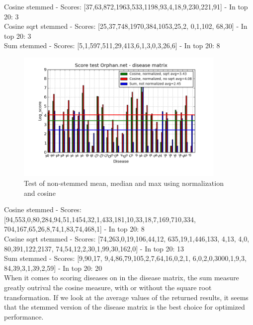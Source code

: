  
Cosine stemmed - Scores: [37,63,872,1963,533,1198,93,4,18,9,230,221,91] - In top 20: 3 \\
Cosine sqrt stemmed - Scores: [25,37,748,1970,384,1053,25,2, 0,1,102, 68,30] - In top 20: 3 \\
Sum stemmed - Scores: [5,1,597,511,29,413,6,1,3,0,3,26,6] - In top 20: 8 \\

\begin{figure}[h!]
        \begin{center}
          \includegraphics[width=0.9\textwidth]{barcharts/diseaseMatrix_orphan_hist_NOTnorm_3000_s_cos_sqrt_cos_sum_nn.png}
        \end{center}
        \caption{Test of non-stemmed mean, median and max using normalization and cosine}
        \label{diseaseMatrix_orphan_hist_NOTnorm_3000_s_cos_sqrt_cos_sum_nn}
\end{figure}

 
Cosine stemmed - Scores: [94,553,0,80,284,94,51,1454,32,1,433,181,10,33,18,7,169,710,334, 704,167,65,26,8,74,1,83,74,468,1] - In top 20: 8 \\
Cosine sqrt stemmed - Scores: [74,263,0,19,106,44,12, 635,19,1,446,133, 4,13, 4,0, 80,391,122,2137, 74,54,12,2,30,1,99,30,162,0] - In top 20: 13 \\
Sum stemmed - Scores: [9,90,17, 9,4,86,79,105,2,7,64,16,0,2,1, 6,0,2,0,3000,1,9,3, 84,39,3,1,39,2,59] - In top 20: 20 \\

When it comes to scoring diseases on in the disease matrix, the sum measure greatly outrival the cosine measure, with or without the square root transformation. If we look at the average values of the returned results, it seems that the stemmed version of the disease matrix is the best choice for optimized performance. \\

